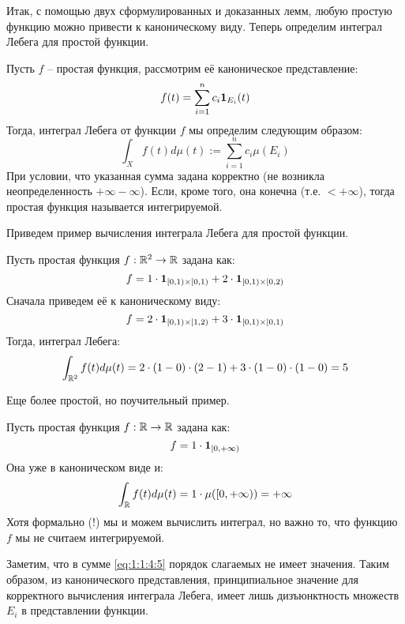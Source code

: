\documentclass[../main.tex]{subfiles}
\begin{document}
Итак, с помощью двух сформулированных и доказанных лемм, любую простую функцию можно привести к каноническому виду. Теперь определим интеграл Лебега для простой функции.

\begin{definition}
	Пусть $f$ -- простая функция, рассмотрим её каноническое представление:
	\begin{equation*}
		f(t) = \sum_{i=1}^{n}{c_i \mathbf{1}_{E_i} (t)}
	\end{equation*}
	Тогда, интеграл Лебега от функции $f$ мы определим следующим образом:
	\begin{equation}\label{eq:1:1:4:5}
		\int_{X}{f (t) d\mu (t)} := \sum_{i=1}^{n}{c_i \mu (E_i)} 
	\end{equation} 
	При условии, что указанная сумма задана корректно (не возникла неопределенность $+\infty - \infty$). Если, кроме того, она конечна (т.е. $< +\infty$), тогда простая функция называется интегрируемой.
\end{definition}

Приведем пример вычисления интеграла Лебега для простой функции.
\begin{example}
	Пусть простая функция $f: \mathbb{R}^2 \to \mathbb{R}$ задана как:
	$$f = 1 \cdot \mathbf{1}_{[0, 1) \times [0, 1)} + 2 \cdot \mathbf{1}_{[0, 1) \times [0, 2)}$$
	Сначала приведем её к каноническому виду:
	$$f = 2 \cdot \mathbf{1}_{[0, 1) \times [1, 2)} + 3 \cdot \mathbf{1}_{[0, 1) \times [0, 1)}$$ 
	Тогда, интеграл Лебега:
	$$\int_{\mathbb{R}^2}{f(t) d\mu(t)} = 2 \cdot (1 - 0) \cdot (2 - 1) + 3 \cdot (1 - 0) \cdot (1 - 0) = 5$$
\end{example}

Еще более простой, но поучительный пример.
\begin{example}
	Пусть простая функция $f : \mathbb{R} \to \mathbb{R}$ задана как:
	$$f = 1 \cdot \mathbf{1}_{[0, +\infty)}$$
	Она уже в каноническом виде и:
	$$\int_{\mathbb{R}}{f(t) d\mu(t)} = 1 \cdot \mu([0, +\infty)) = +\infty$$
	Хотя формально (!) мы и можем вычислить интеграл, но важно то, что функцию $f$ мы не считаем интегрируемой.
\end{example}

Заметим, что в сумме \eqref{eq:1:1:4:5} порядок слагаемых не имеет значения. Таким образом, из канонического представления, принципиальное значение для корректного вычисления интеграла Лебега, имеет лишь дизъюнктность множеств $E_i$ в представлении функции. 
\end{document}
